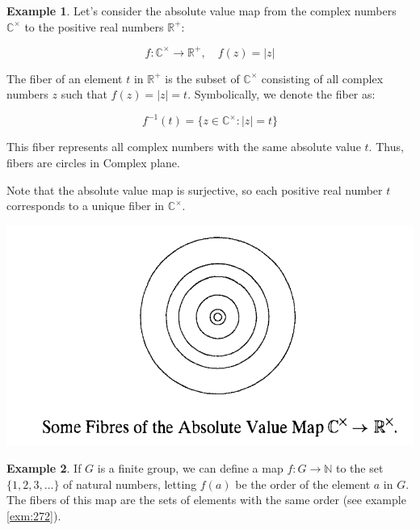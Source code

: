 \documentclass[
]{book}
\theoremstyle{definition}
\theoremstyle{definition}
\newtheorem{example}{Example}[chapter]
\theoremstyle{definition}
\theoremstyle{definition}
\theoremstyle{remark}
\begin{document}
\begin{example}
\protect\hypertarget{exm:unnamed-chunk-33}{}\label{exm:unnamed-chunk-33}Let's consider the absolute value map from the complex numbers \(\mathbb{C}^\times\) to the positive real numbers \(\mathbb{R}^+\):

\[ f: \mathbb{C}^\times \to \mathbb{R}^+, \quad f(z) = |z| \]

The fiber of an element \(t\) in \(\mathbb{R}^+\) is the subset of \(\mathbb{C}^\times\) consisting of all complex numbers \(z\) such that \(f(z) = |z| = t\). Symbolically, we denote the fiber as:

\[ f^{-1}(t) = \{ z \in \mathbb{C}^\times : |z| = t \} \]

This fiber represents all complex numbers with the same absolute value \(t\). Thus, fibers are circles in Complex plane.

Note that the absolute value map is surjective, so each positive real number \(t\) corresponds to a unique fiber in \(\mathbb{C}^\times\).
\end{example}

\includegraphics{figures/ch_2/fig33.png}

\begin{example}
\protect\hypertarget{exm:unnamed-chunk-34}{}\label{exm:unnamed-chunk-34}If \(G\) is a finite group, we can define a map \(f : G \to \mathbb{N}\) to the set \(\{1, 2, 3, \ldots\}\) of natural numbers, letting \(f(a)\) be the order of the element \(a\) in \(G\). The fibers of this map are the sets of elements with the same order (see example \ref{exm:272}).
\end{example}
\end{document}
